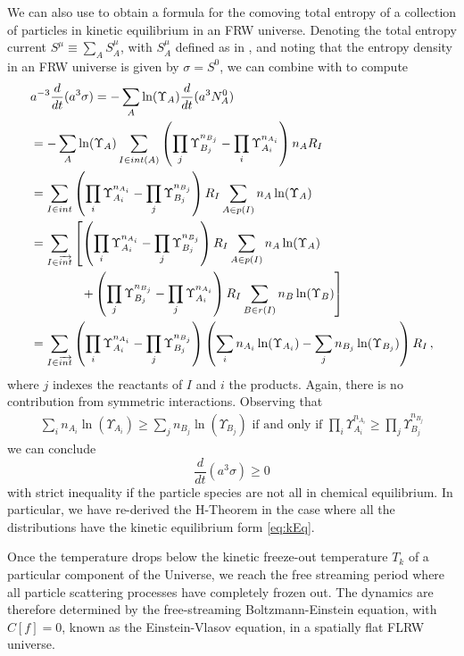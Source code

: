 {We can also use  to obtain a formula for the  comoving total entropy of a collection of particles in kinetic equilibrium in an FRW universe. Denoting the total entropy current  $S^\mu\equiv\sum_A S_A^\mu$, with $S_A^\mu$ defined as in , and noting that the entropy density in an FRW universe  is given by $\sigma=S^0$, we can   combine  with  to compute
\begin{align}
&a^{-3}\frac{d}{dt}(a^3\sigma)=-\sum_A \ln(\Upsilon_A) \frac{d}{dt}(a^3N_A^0)\\
&=-\sum_A \ln(\Upsilon_A)\sum_{I\in int(A)} \left(\prod_j\Upsilon_{B_j}^{n_{B_j}}- \prod_i\Upsilon_{A_i}^{n_{A_i}}\right)n_A R_I\notag\\
&=\sum_{I\in int} \left( \prod_i\Upsilon_{A_i}^{n_{A_i}}-\prod_j\Upsilon_{B_j}^{n_{B_j}}\right)R_I\sum_{A\in p(I)}n_A \ln(\Upsilon_A)\notag\\
&=\sum_{I\in \overrightarrow{int}} \left[\left( \prod_i\Upsilon_{A_i}^{n_{A_i}}-\prod_j\Upsilon_{B_j}^{n_{B_j}}\right)R_I\sum_{A\in p(I)}n_A \ln(\Upsilon_A)\right.\notag\\
&\left.\qquad\qquad+\left( \prod_j\Upsilon_{B_j}^{n_{B_j}}-\prod_j\Upsilon_{A_i}^{n_{A_i}}\right)R_I\sum_{B\in r(I)}n_B \ln(\Upsilon_B)\right]\notag\\
&=\sum_{I\in \overrightarrow{int}} \left( \prod_i\Upsilon_{A_i}^{n_{A_i}}-\prod_j\Upsilon_{B_j}^{n_{B_j}}\right)\left(\sum_i n_{A_i}\ln(\Upsilon_{A_i})-\sum_jn_{B_j}\ln(\Upsilon_{B_j})\right)R_I\,,\notag
\end{align}
where $j$ indexes the reactants of $I$ and $i$ the products.  Again, there is no contribution from symmetric interactions.  Observing that 
 \begin{align}
     \sum_in_{A_i}\ln(\Upsilon_{A_i})\geq \sum_jn_{B_j} \ln(\Upsilon_{B_j}) \text{ if and only if }\prod_i \Upsilon^{n_{A_i}}_{A_i}\geq\prod_j\Upsilon^{n_{B_j}}_{B_j}
 \end{align} 
 we can conclude 
\begin{equation}
\frac{d}{dt}(a^3\sigma)\geq 0
\end{equation}
with strict inequality if the particle species are not all in chemical equilibrium.  In particular, we have re-derived the H-Theorem in the case where all the distributions have the kinetic equilibrium form \eqref{eq:kEq}.

}
Once the temperature drops below the kinetic freeze-out temperature $T_k$ of a particular component of the Universe, we reach the free streaming period where all particle scattering processes have completely frozen out. The dynamics are therefore determined by the free-streaming Boltzmann-Einstein equation,  with $C[f]=0$, known as the Einstein-Vlasov equation, in a spatially flat FLRW universe.

